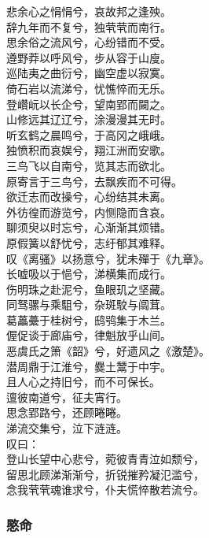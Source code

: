 \documentclass[]{article}
\begin{document}
悲余心之悁悁兮，哀故邦之逢殃。\\
辞九年而不复兮，独茕茕而南行。\\
思余俗之流风兮，心纷错而不受。\\
遵野莽以呼风兮，步从容于山廋。\\
巡陆夷之曲衍兮，幽空虚以寂寞。\\
倚石岩以流涕兮，忧憔悴而无乐。\\
登巑岏以长企兮，望南郢而闚之。\\
山修远其辽辽兮，涂漫漫其无时。\\
听玄鹤之晨鸣兮，于高冈之峨峨。\\
独愤积而哀娱兮，翔江洲而安歌。\\
三鸟飞以自南兮，览其志而欲北。\\
原寄言于三鸟兮，去飘疾而不可得。\\
欲迁志而改操兮，心纷结其未离。\\
外彷徨而游览兮，内恻隐而含哀。\\
聊须臾以时忘兮，心渐渐其烦错。\\
原假簧以舒忧兮，志纡郁其难释。\\
叹《离骚》以扬意兮，犹未殫于《九章》。\\
长嘘吸以于悒兮，涕横集而成行。\\
伤明珠之赴泥兮，鱼眼玑之坚藏。\\
同驽骡与乘駔兮，杂斑駮与阘茸。\\
葛藟虆于桂树兮，鸱鸮集于木兰。\\
偓促谈于廊庙兮，律魁放乎山间。\\
恶虞氏之箫《韶》兮，好遗风之《激楚》。\\
潜周鼎于江淮兮，爨土鬵于中宇。\\
且人心之持旧兮，而不可保长。\\
邅彼南道兮，征夫宵行。\\
思念郢路兮，还顾睠睠。\\
涕流交集兮，泣下涟涟。\\
叹曰：\\
登山长望中心悲兮，菀彼青青泣如颓兮，\\
留思北顾涕渐渐兮，折锐摧矜凝氾滥兮，\\
念我茕茕魂谁求兮，仆夫慌悴散若流兮。

\hypertarget{header-n3112}{%
\subsubsection{愍命}\label{header-n3112}}
\end{document}

